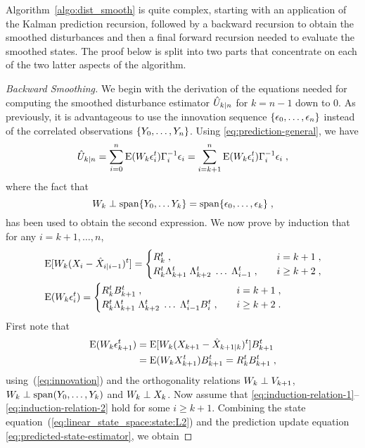 Algorithm~\ref{algo:dist_smooth} is quite complex, starting with an
application of the Kalman prediction recursion, followed by a backward
recursion to obtain the smoothed disturbances and then a final forward recursion
needed to evaluate the smoothed states. The proof below is split into two
parts that concentrate on each of the two latter aspects of the algorithm.

\begin{proof}[Backward Smoothing] We begin with the derivation of the equations needed for computing the
  smoothed disturbance estimator $\hat{U}_{k|n}$ for $k=n-1$ down to 0. As
  previously, it is advantageous to use the innovation sequence $\{\epsilon_{0},
  \ldots, \epsilon_n \}$ instead of the correlated observations $\{ Y_0, \dotsc,
  Y_n\}$. Using \eqref{eq:prediction-general}, we have
\begin{equation}
  \label{eq:nprjf}
  \hat{U}_{k|n} = \sum_{i=0}^n  \operatorname{E}(W_k \epsilon_i^t) \Gamma_i^{-1}\epsilon_i = \sum_{i=k+1}^n \operatorname{E}(W_k \epsilon_i^t) \Gamma_i^{-1}\epsilon_i \;,
\end{equation}
where the fact that
$$
W_k \perp \operatorname{span} \{ Y_0, \ldots Y_{k} \} = \operatorname{span} \{ \epsilon_0, \ldots, \epsilon_k\} \; ,
$$
has been used to obtain the second expression. We now prove by
induction that for any $i = k+1, \dotsc, n$,
\begin{align}
\label{eq:induction-relation-1}
& \operatorname{E}[W_k(X_i - \hat{X}_{i|i-1})^t]= \begin{cases}
R_k^t \;, & \quad i=k+1 \;, \\
R_k^t \Lambda_{k+1}^t \; \Lambda_{k+2}^t \; \dotsc \; \Lambda_{i-1}^t
  \;, & \quad i \geq k+2 \;,\\
\end{cases}\\
\label{eq:induction-relation-2}
& \operatorname{E}(W_k \epsilon_i^t) = \begin{cases}
R_k^t B_{k+1}^t \;, & \quad i = k+1 \;, \\
R_k^t \Lambda_{k+1}^t \; \Lambda_{k+2}^t \; \dotsc \; \Lambda_{i-1}^t B_i^t
  \;, & \quad i \geq k+2 \;.
\end{cases}
\end{align}
First note that
\begin{align*}
  \operatorname{E}(W_k \epsilon_{k+1}^t) & = \operatorname{E}[W_k(X_{k+1}-\hat{X}_{k+1|k})^t]B_{k+1}^t \\
  & = \operatorname{E}(W_k X_{k+1}^t) B_{k+1}^t =  R_k^t B_{k+1}^t \; ,
\end{align*}
using~(\ref{eq:innovation}) and the orthogonality relations $W_k \perp V_{k+1}$, $W_k \perp \operatorname{span}(Y_0, \ldots, Y_k)$ and $W_k \perp X_k$. Now assume that \eqref{eq:induction-relation-1}--\eqref{eq:induction-relation-2} hold for some $i \geq k+1$. Combining the state equation~(\ref{eq:linear_state_space:state:L2}) and the prediction update equation \eqref{eq:predicted-state-estimator}, we obtain

\end{proof}
